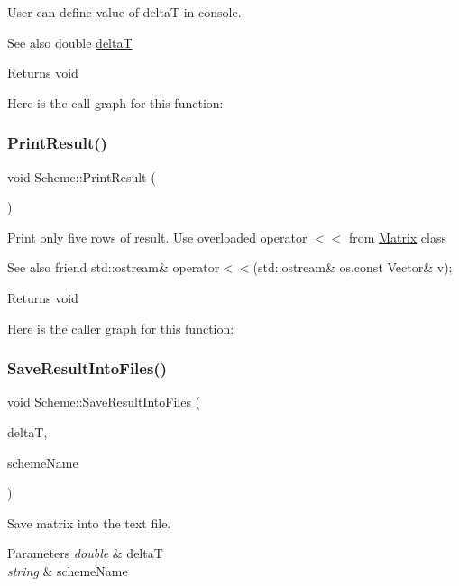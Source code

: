 User can define value of deltaT in console. \begin{DoxySeeAlso}{See also}
double \mbox{\hyperlink{class_scheme_aaaf978f98d30bd96ea56a9387d1b2c5a}{deltaT}} 
\end{DoxySeeAlso}
\begin{DoxyReturn}{Returns}
void 
\end{DoxyReturn}
Here is the call graph for this function\+:
\mbox{\label{class_scheme_ae26048cf5128c6ea6e698a7036f2cc42}} 
\subsubsection{\texorpdfstring{Print\+Result()}{PrintResult()}}
{\footnotesize\ttfamily void Scheme\+::\+Print\+Result (\begin{DoxyParamCaption}{ }\end{DoxyParamCaption})}

Print only five rows of result. Use overloaded operator $<$$<$ from \mbox{\hyperlink{class_matrix}{Matrix}} class \begin{DoxySeeAlso}{See also}
friend std\+::ostream\& operator$<$$<$(std\+::ostream\& os,const Vector\& v); 
\end{DoxySeeAlso}
\begin{DoxyReturn}{Returns}
void 
\end{DoxyReturn}
Here is the caller graph for this function\+:
\mbox{\label{class_scheme_ae4512b4c8ead4d8ced95174f0b241f8a}} 
\subsubsection{\texorpdfstring{Save\+Result\+Into\+Files()}{SaveResultIntoFiles()}}
{\footnotesize\ttfamily void Scheme\+::\+Save\+Result\+Into\+Files (\begin{DoxyParamCaption}\item[{double}]{deltaT,  }\item[{string}]{scheme\+Name }\end{DoxyParamCaption})}

Save matrix into the text file. 
\begin{DoxyParams}{Parameters}
{\em double} & deltaT \\
\hline
{\em string} & scheme\+Name \\
\hline
\end{DoxyParams}

